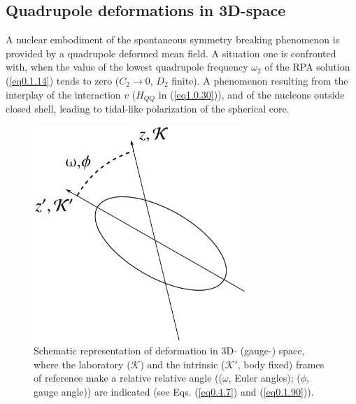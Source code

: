 \subsection{Quadrupole deformations in 3D-space}
A nuclear embodiment of the spontaneous symmetry breaking phenomenon is provided by a quadrupole deformed  mean field. A situation one is confronted with, when the value of the lowest quadrupole frequency $\omega_2$ of the RPA solution (\ref{eq0.1.14}) tends to zero ($C_2\to0$, $D_2$ finite). A phenomenon resulting from the interplay of the interaction $v$ ($H_{QQ}$ in (\ref{eq1.0.30})), and of the nucleons outside closed shell, leading to tidal-like polarization of the spherical core.
\begin{figure}
	\centerline {
		\includegraphics*[width=8cm, angle=0.]{introduccion/figs/fig0_4_4}
	}
	\caption{Schematic representation of deformation in  3D- (gauge-) space, where the laboratory ($\mathcal K$) and the intrinsic ($\mathcal K'$, body fixed) frames of reference make a relative relative angle (($\omega$, Euler angles); ($\phi$, gauge angle)) are  indicated (see Eqs. (\ref{eq0.4.7}) and (\ref{eq0.1.90})).}
	\label{fig0.4.4}
\end{figure}
